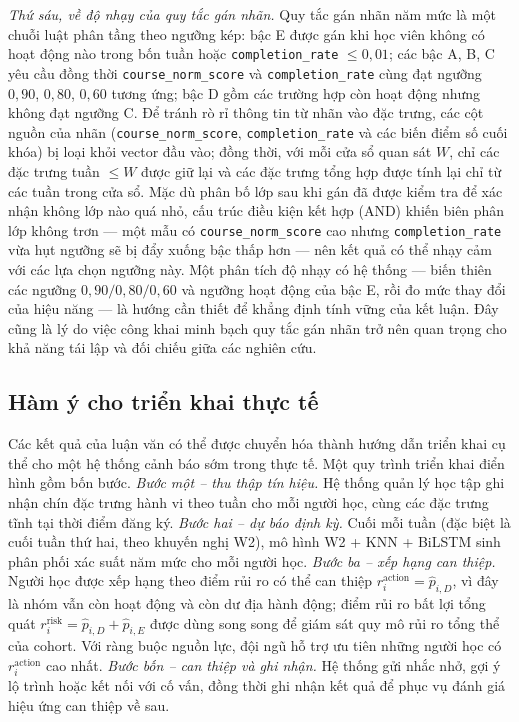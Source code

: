 \textit{Thứ sáu, về độ nhạy của quy tắc gán nhãn.} Quy tắc gán nhãn năm mức là một chuỗi luật phân tầng theo ngưỡng kép: bậc E được gán khi học viên không có hoạt động nào trong bốn tuần hoặc \texttt{completion\_rate} $\leq 0{,}01$; các bậc A, B, C yêu cầu đồng thời \texttt{course\_norm\_score} và \texttt{completion\_rate} cùng đạt ngưỡng $0{,}90$, $0{,}80$, $0{,}60$ tương ứng; bậc D gồm các trường hợp còn hoạt động nhưng không đạt ngưỡng C. Để tránh rò rỉ thông tin từ nhãn vào đặc trưng, các cột nguồn của nhãn (\texttt{course\_norm\_score}, \texttt{completion\_rate} và các biến điểm số cuối khóa) bị loại khỏi vector đầu vào; đồng thời, với mỗi cửa sổ quan sát $W$, chỉ các đặc trưng tuần $\leq W$ được giữ lại và các đặc trưng tổng hợp được tính lại chỉ từ các tuần trong cửa sổ. Mặc dù phân bố lớp sau khi gán đã được kiểm tra để xác nhận không lớp nào quá nhỏ, cấu trúc điều kiện kết hợp (AND) khiến biên phân lớp không trơn --- một mẫu có \texttt{course\_norm\_score} cao nhưng \texttt{completion\_rate} vừa hụt ngưỡng sẽ bị đẩy xuống bậc thấp hơn --- nên kết quả có thể nhạy cảm với các lựa chọn ngưỡng này. Một phân tích độ nhạy có hệ thống --- biến thiên các ngưỡng $0{,}90/0{,}80/0{,}60$ và ngưỡng hoạt động của bậc E, rồi đo mức thay đổi của hiệu năng --- là hướng cần thiết để khẳng định tính vững của kết luận. Đây cũng là lý do việc công khai minh bạch quy tắc gán nhãn trở nên quan trọng cho khả năng tái lập và đối chiếu giữa các nghiên cứu.

\subsection{Hàm ý cho triển khai thực tế}

Các kết quả của luận văn có thể được chuyển hóa thành hướng dẫn triển khai cụ thể cho một hệ thống cảnh báo sớm trong thực tế. Một quy trình triển khai điển hình gồm bốn bước. \textit{Bước một -- thu thập tín hiệu.} Hệ thống quản lý học tập ghi nhận chín đặc trưng hành vi theo tuần cho mỗi người học, cùng các đặc trưng tĩnh tại thời điểm đăng ký. \textit{Bước hai -- dự báo định kỳ.} Cuối mỗi tuần (đặc biệt là cuối tuần thứ hai, theo khuyến nghị W2), mô hình W2 + KNN + BiLSTM sinh phân phối xác suất năm mức cho mỗi người học. \textit{Bước ba -- xếp hạng can thiệp.} Người học được xếp hạng theo điểm rủi ro có thể can thiệp $r_i^{\text{action}} = \hat{p}_{i,D}$, vì đây là nhóm vẫn còn hoạt động và còn dư địa hành động; điểm rủi ro bất lợi tổng quát $r_i^{\text{risk}} = \hat{p}_{i,D} + \hat{p}_{i,E}$ được dùng song song để giám sát quy mô rủi ro tổng thể của cohort. Với ràng buộc nguồn lực, đội ngũ hỗ trợ ưu tiên những người học có $r_i^{\text{action}}$ cao nhất. \textit{Bước bốn -- can thiệp và ghi nhận.} Hệ thống gửi nhắc nhở, gợi ý lộ trình hoặc kết nối với cố vấn, đồng thời ghi nhận kết quả để phục vụ đánh giá hiệu ứng can thiệp về sau.

